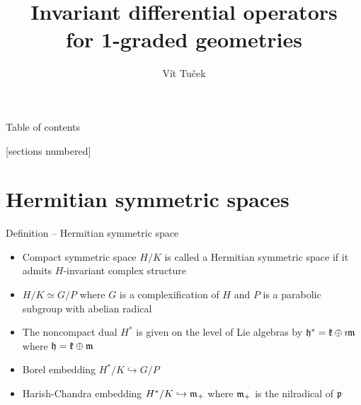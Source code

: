\documentclass[10pt]{beamer}
\title{Invariant differential operators \\ for 1-graded geometries}
\date{}
\author{Vít Tuček}
\institute{Mathematical Institute of Charles University}
\begin{document}

\maketitle


\begin{frame}{Table of contents}

[sections numbered]

\tableofcontents[hideallsubsections]

\end{frame}










\section{Hermitian symmetric spaces}


\begin{frame}{Definition -- Hermitian symmetric space}

\begin{itemize}[<+- | alert@+>]
\item Compact symmetric space $H/K$ is called a Hermitian symmetric space if it admits $H$-invariant complex structure
\item $H/K \simeq G/P$ where $G$ is a complexification of $H$ and $P$ is a parabolic subgroup with abelian radical
\item The noncompact dual $H^*$ is given on the level of Lie algebras by $\mathfrak{h}^* = \mathfrak{k} \oplus \imath \mathfrak{m}$ where $\mathfrak{h} = \mathfrak{k} \oplus \mathfrak{m}$
\item Borel embedding $H^*/K \hookrightarrow G/P$
\item Harish-Chandra embedding $H^*/K \hookrightarrow \mathfrak{m}_+$ where $\mathfrak{m}_+$ is the nilradical of $\mathfrak{p}$
\end{itemize}

\end{frame}
\end{document}
